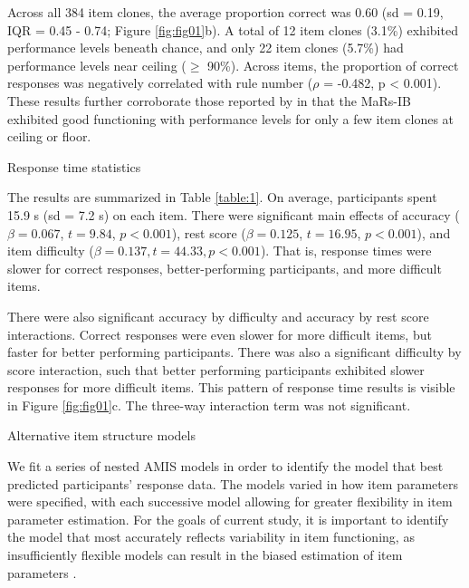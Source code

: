\documentclass[a4paper,man,natbib]{apa6}
\makeatletter
\renewcommand{\subsubsection}{\@startsection{subsubsection}{3}
  {\z@}%
  {\b@level@two@skip}{\e@level@two@skip}%
  {\normalfont\normalsize\bfseries}}
\makeatother
\begin{document}
Across all 384 item clones, the average proportion correct was 0.60 (sd = 0.19, IQR = 0.45 - 0.74; Figure \ref{fig:fig01}b). A total of 12 item clones (3.1\%) exhibited performance levels beneath chance, and only 22 item clones (5.7\%) had performance levels near ceiling ($\geq$ 90\%). Across items, the proportion of correct responses was negatively correlated with rule number ($\rho$ = -0.482, p < 0.001). These results further corroborate those reported by \cite{chierchia2019matrix} in that the MaRs-IB exhibited good functioning with performance levels for only a few item clones at ceiling or floor. 

\subsubsection{Response time statistics}

The results are summarized in Table \ref{table:1}. On average, participants spent 15.9 s (sd = 7.2 s) on each item. There were significant main effects of accuracy ($\beta = 0.067$, $t = 9.84$, $p < 0.001$), rest score ($\beta = 0.125$, $t = 16.95$, $p < 0.001$), and item difficulty ($\beta = 0.137, t = 44.33, p < 0.001$). That is, response times were slower for correct responses, better-performing participants, and more difficult items.

There were also significant accuracy by difficulty and  accuracy by rest score interactions. Correct responses were even slower for more difficult items, but faster for better performing participants. There was also a significant difficulty by score interaction, such that better performing participants exhibited slower responses for more difficult items. This pattern of response time results is visible in Figure \ref{fig:fig01}c. The three-way interaction term was not significant. 

\subsubsection{Alternative item structure models}

We fit a series of nested AMIS models in order to identify the model that best predicted participants' response data. The models varied in how item parameters were specified, with each successive model allowing for greater flexibility in item parameter estimation. For the goals of current study, it is important to identify the model that most accurately reflects variability in item functioning, as insufficiently flexible models can result in the biased estimation of item parameters \citep{lathrop2017item}. 
\end{document}
